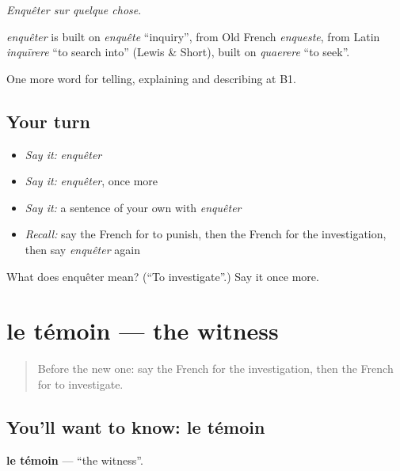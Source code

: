 \emph{Enquêter sur quelque chose}.

\begin{cousinweb}
\emph{enquêter} is built on \emph{enquête} \textquotedblleft{}inquiry\textquotedblright{}, from Old French \emph{enqueste}, from Latin \emph{inquīrere} \textquotedblleft{}to search into\textquotedblright{} (Lewis \& Short), built on \emph{quaerere} \textquotedblleft{}to seek\textquotedblright{}.
\end{cousinweb}

\begin{grammarlens}[title={What you've built}]
One more word for telling, explaining and describing at B1.
\end{grammarlens}

\subsection*{Your turn}
\begin{itemize}
\raggedright
  \item \emph{Say it:} \emph{enquêter}
  \item \emph{Say it:} \emph{enquêter}, once more
  \item \emph{Say it:} a sentence of your own with \emph{enquêter}
  \item \emph{Recall:} say the French for to punish, then the French for the investigation, then say \emph{enquêter} again
\end{itemize}

\begin{tcolorbox}[breakable,colback=teal!4,colframe=teal!35!black,title={Before you move on}]
What does enquêter mean? (\textquotedblleft{}To investigate\textquotedblright{}.) Say it once more.
\end{tcolorbox}
\section[le témoin]{le témoin — the witness}

\label{lesson:FR-C389-temoin}



\begin{quote}
Before the new one: say the French for the investigation, then the French for to investigate.
\end{quote}

\subsection*{You'll want to know: le témoin}
\textbf{le témoin} — \textquotedblleft{}the witness\textquotedblright{}.

